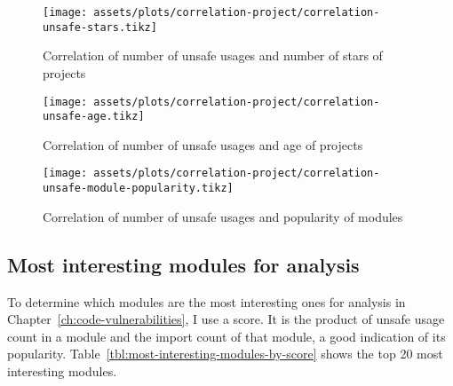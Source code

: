 \begin{figure}[ht]
    \centering
    {\scriptsize \texttt{[image: assets/plots/correlation-project/correlation-unsafe-stars.tikz]}}
    \caption{Correlation of number of unsafe usages and number of stars of projects}
    \label{fig:correlations-project-unsafe-stars}
\end{figure}

\begin{figure}[ht]
    \centering
    {\scriptsize \texttt{[image: assets/plots/correlation-project/correlation-unsafe-age.tikz]}}
    \caption{Correlation of number of unsafe usages and age of projects}
    \label{fig:correlations-project-unsafe-age}
\end{figure}

\begin{figure}[ht]
    \centering
    {\scriptsize \texttt{[image: assets/plots/correlation-project/correlation-unsafe-module-popularity.tikz]}}
    \caption{Correlation of number of unsafe usages and popularity of modules}
    \label{fig:correlations-module-unsafe-popularity}
\end{figure}



\subsection{Most interesting modules for analysis}\label{subsec:results-most-interesting-modules}

To determine which modules are the most interesting ones for analysis in Chapter~\ref{ch:code-vulnerabilities}, I use
a score.
It is the product of unsafe usage count in a module and the import count of that module, a good indication of its
popularity. Table~\ref{tbl:most-interesting-modules-by-score} shows the top 20 most interesting modules.

